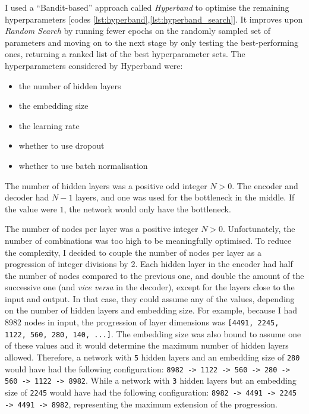 I used a ``Bandit-based'' approach called \textit{Hyperband} \cite{DBLP:journals/corr/LiJDRT16} to optimise the remaining hyperparameters
[codes \ref{lst:hyperband},\ref{lst:hyperband_search}].
It improves upon \textit{Random Search} by running fewer epochs on the randomly sampled set of parameters
and moving on to the next stage by only testing the best-performing ones, returning a ranked list of the best hyperparameter sets.
The hyperparameters considered by Hyperband were:

\begin{itemize}
  \item the number of hidden layers
  \item the embedding size
  \item the learning rate
  \item whether to use dropout
  \item whether to use batch normalisation
\end{itemize}

The number of hidden layers was a positive odd integer $N > 0$.
The encoder and decoder had $N-1$ layers, and one was used for the bottleneck in the middle.
If the value were $1$, the network would only have the bottleneck.

The number of nodes per layer was a positive integer $N > 0$. Unfortunately, the number of combinations was too high to be
meaningfully optimised. To reduce the complexity, I decided to couple the number of nodes per layer as a progression
of integer divisions by 2.
Each hidden layer in the encoder had half the number of nodes compared to the previous one, and double the amount of the successive one
(and \textit{vice versa} in the decoder), except for the layers close to the input and output.
In that case, they could assume any of the values, depending on the number of hidden layers and embedding size.
For example, because I had 8982 nodes in input, the progression of layer dimensions
was \verb|[4491, 2245, 1122, 560, 280, 140, ...]|.
The embedding size was also bound to assume one of these values and it would determine
the maximum number of hidden layers allowed.
Therefore, a network with \verb|5| hidden layers and an embedding size of \verb|280|
would have had the following configuration: \verb|8982 -> 1122 -> 560 -> 280 -> 560 -> 1122 -> 8982|.
While a network with \verb|3| hidden layers but an embedding size of \verb|2245| would have had the following configuration:
\verb|8982 -> 4491 -> 2245 -> 4491 -> 8982|, representing the maximum extension of the progression.


